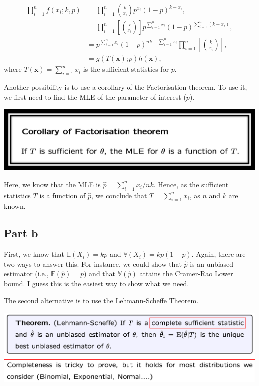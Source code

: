 \documentclass[12pt]{article}
\begin{document}
\begin{align}
\prod_{i=1}^{n} f(x_{i}; k, p) & = \prod_{i=1}^{n} {k \choose x_{i}}p^{x_{i}} (1-p)^{k-x_{i}}, \\
& = \prod_{i=1}^{n} \left[ {k \choose x_{i}} \right] p^{ \sum_{i=1}^{n} x_{i}} (1-p)^{\sum_{i=1}^{n} (k-x_{i})}, \\
& = p^{\sum_{i=1}^{n} x_{i}} (1-p)^{ nk- \sum_{i=1}^{n}x_{i}} \prod_{i=1}^{n} \left[ {k \choose x_{i}} \right], \\
& = g(T(\textbf{x}); p) h(\textbf{x}),
\end{align}
where $T(\textbf{x}) = \sum_{i=1}^{n} x_{i}$ is the sufficient statistics for $p$.

Another possibility is to use a corollary of the Factorisation theorem. To use it, we first need to find the MLE of the parameter of interest ($p$). 

\includegraphics[width=1\linewidth]{corollary_factorisation_theorem.png}

Here, we know that the MLE is $\hat{p} = \sum_{i=1}^{n}x_{i}/nk$. Hence, as the sufficient statistics $T$ is a function of $\hat{p}$, we conclude that $T = \sum_{i=1}^{n}x_{i}$, as $n$ and $k$ are known.

\subsection*{Part b}

First, we know that $\mathbb{E}(X_{i}) = kp$ and $\mathbb{V}(X_{i}) = kp(1-p)$. Again, there are two ways to answer this. For instance, we could show that $\hat{p}$ is an unbiased estimator (i.e., $\mathbb{E}(\hat{p})= p$) and that $\mathbb{V}(\hat{p})$ attains the Cramer-Rao Lower bound. I guess this is the easiest way to show what we need.

The second alternative is to use the Lehmann-Scheffe Theorem.

\includegraphics[width=1\linewidth]{Leman_theorem.png}
\end{document}
